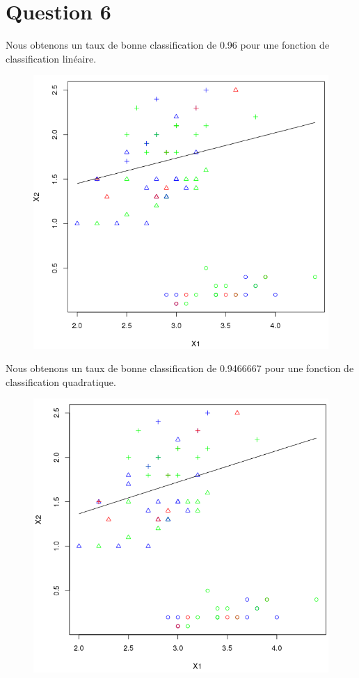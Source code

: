 \documentclass[a4paper,12pt]{report}
\begin{document}
\section*{Question 6}
Nous obtenons un taux de bonne classification de 0.96 pour une fonction de classification linéaire.
\begin{figure}[!ht]
	\center
	\includegraphics[scale=0.4]{image/q6_1.png}
\end{figure}

Nous obtenons un taux de bonne classification de 0.9466667 pour une fonction de classification quadratique.

\begin{figure}[!ht]
	\center
	\includegraphics[scale=0.4]{image/q6_2.png}
\end{figure}
\end{document}
